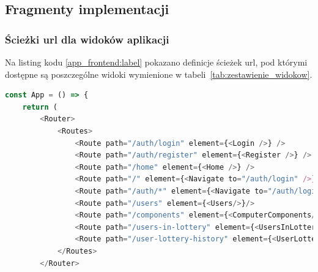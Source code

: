 \subsection{Fragmenty implementacji}
	\subsubsection{Ścieżki url dla widoków aplikacji}
	Na listing kodu \ref{app_frontend:label} pokazano definicje ścieżek url, pod którymi dostępne są poszczególne widoki wymienione w tabeli~\ref{tab:zestawienie_widokow}.
\begin{lstlisting}[language=JavaScript, style=JavaScriptStyle,  caption={Zdefiniowane ścieżki url widoków systemu }, label={app_frontend:label}]
	const App = () => {
    return (
        <Router>
            <Routes>
                <Route path="/auth/login" element={<Login />} />
                <Route path="/auth/register" element={<Register />} />
                <Route path="/home" element={<Home />} />
                <Route path="/" element={<Navigate to="/auth/login" />} />
                <Route path="/auth/*" element={<Navigate to="/auth/login" />} />
                <Route path="/users" element={<Users/>}/>
                <Route path="/components" element={<ComputerComponents/>}/>
                <Route path="/users-in-lottery" element={<UsersInLottery/>}/>
                <Route path="/user-lottery-history" element={<UserLotteryHistory/>}/>
            </Routes>
        </Router>
\end{lstlisting}


